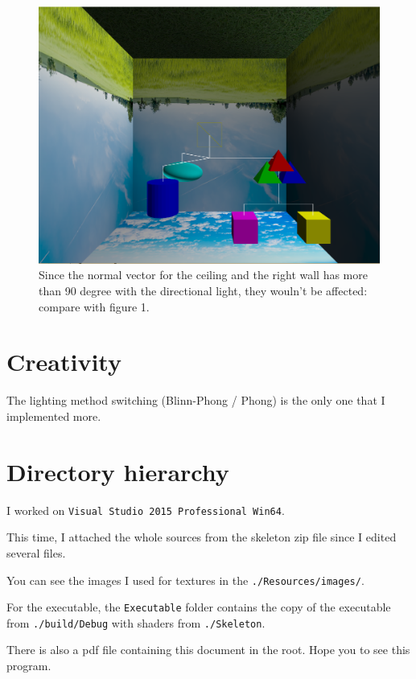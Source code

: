 \documentclass[11pt]{article}
\begin{document}
\begin{figure}[htb]
	\begin{center}
		\includegraphics[width=0.8\linewidth]{directionalLight.png}
	\end{center}
	\caption{Since the normal vector for the ceiling and the right wall has more than 90 degree with the directional light, they wouln't be affected: compare with figure 1.}
\end{figure}

\section{Creativity} \label{sec:3}
The lighting method switching (Blinn-Phong / Phong) is the only one that I implemented more.
\newpage

\section{Directory hierarchy}
I worked on \texttt{Visual Studio 2015 Professional Win64}.

This time, I attached the whole sources from the skeleton zip file since I edited several files.

You can see the images I used for textures in the \texttt{./Resources/images/}.

For the executable, the \texttt{Executable} folder contains the copy of the executable from \texttt{./build/Debug} with shaders from \texttt{./Skeleton}.

There is also a pdf file containing this document in the root. Hope you to see this program.

\end{document}
